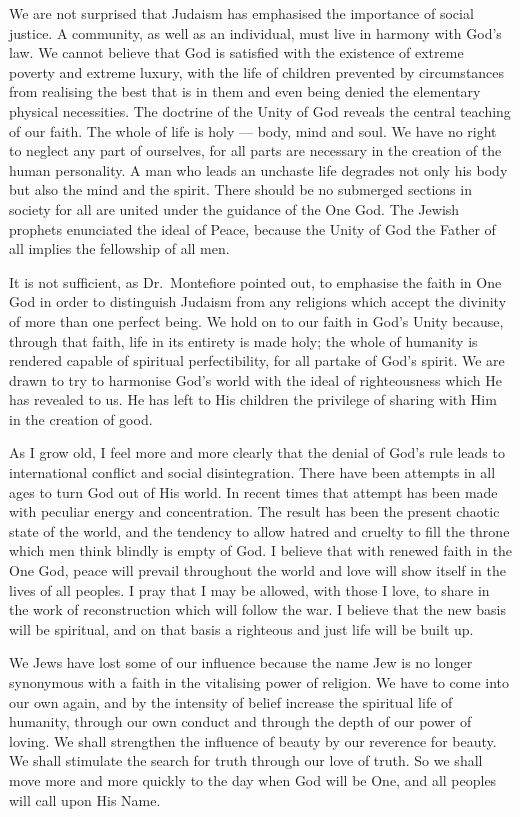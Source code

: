 We are not surprised that Judaism has emphasised
the importance of social justice. A community, as well
as an individual, must live in harmony with God’s law.
We cannot believe that God is satisfied with the existence
of extreme poverty and extreme luxury, with the life of
children prevented by circumstances from realising the
best that is in them and even being denied the elementary
physical necessities. The doctrine of the Unity of God
reveals the central teaching of our faith. The whole of
life is holy — body, mind and soul. We have no right to
neglect any part of ourselves, for all parts are necessary
in the creation of the human personality. A man who
leads an unchaste life degrades not only his body but also
the mind and the spirit. There should be no submerged
sections in society for all are united under the guidance
of the One God. The Jewish prophets enunciated the
ideal of Peace, because the Unity of God the Father of
all implies the fellowship of all men.

It is not sufficient, as Dr.\ Montefiore pointed out,
to emphasise the faith in One God in order to
distinguish Judaism from any religions which accept the
divinity of more than one perfect being. We hold on to
our faith in God’s Unity because, through that faith,
life in its entirety is made holy; the whole of humanity
is rendered capable of spiritual perfectibility, for all
partake of God’s spirit. We are drawn to try to harmonise
God’s world with the ideal of righteousness which He
has revealed to us. He has left to His children the
privilege of sharing with Him in the creation of good.

As I grow old, I feel more and more clearly that the
denial of God’s rule leads to international conflict and
social disintegration. There have been attempts in all
ages to turn God out of His world. In recent times that
attempt has been made with peculiar energy and
concentration. The result has been the present chaotic
state of the world, and the tendency to allow hatred and
cruelty to fill the throne which men think blindly is empty
of God. I believe that with renewed faith in the One
God, peace will prevail throughout the world and love
will show itself in the lives of all peoples. I pray that I
may be allowed, with those I love, to share in the work
of reconstruction which will follow the war. I believe
that the new basis will be spiritual, and on that basis a
righteous and just life will be built up.

We Jews have lost some of our influence because the
name Jew is no longer synonymous with a faith in the
vitalising power of religion. We have to come into our
own again, and by the intensity of belief increase the
spiritual life of humanity, through our own conduct and
through the depth of our power of loving. We shall
strengthen the influence of beauty by our reverence for
beauty. We shall stimulate the search for truth through
our love of truth. So we shall move more and more
quickly to the day when God will be One, and all peoples
will call upon His Name.

